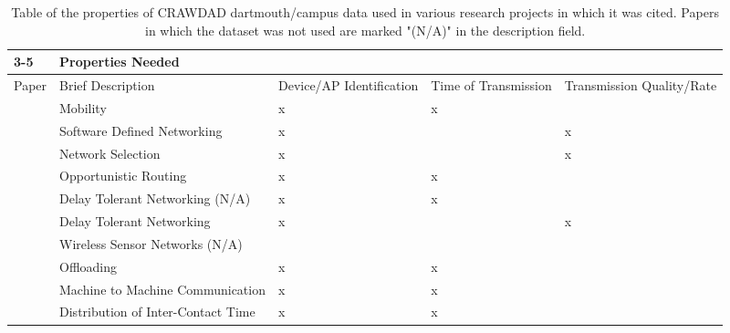 \begin{table}
\small
\begin{tabular}{|p{1cm}|p{3cm}|p{2cm}|p{2cm}|p{2cm}|}
\cline{3-5}
\multicolumn{2}{}{} & \multicolumn{3}{|p{6cm}|}{Properties Needed} \\ \hline
Paper     & Brief Description                        & Device/AP Identification   & Time of Transmission  & Transmission Quality/Rate  \\ \hline
\cite{Shi2018}          & Mobility                           & x                          & x                     &                            \\ \hline
\cite{Amokrane2015}     & Software Defined Networking        & x                          &                       & x                          \\ \hline
\cite{Yang2014}         & Network Selection                  & x                          &                       & x                          \\ \hline
\cite{Xiao2014}         & Opportunistic Routing              & x                          & x                     &                            \\ \hline
\cite{Baudic2016}       & Delay Tolerant Networking   (N/A)  & x                          & x                     &                            \\ \hline
\cite{Feng2012}         & Delay Tolerant Networking          & x                          &                       & x                          \\ \hline
\cite{Sun2016}          & Wireless Sensor Networks    (N/A)  &                            &                       &                            \\ \hline
\cite{Zhou2018}         & Offloading                         & x                          & x                     &                            \\ \hline
\cite{Swain2017}        & Machine to Machine Communication   & x                          & x                     &                            \\ \hline
\cite{Wei2013}          & Distribution of Inter-Contact Time & x                          & x                     &                            \\ \hline
\end{tabular}
\caption{Table of the properties of CRAWDAD dartmouth/campus data used in various research projects in which it was cited. Papers in which the dataset was not used are marked "(N/A)" in the description field.}
\label{usageTable}
\end{table}
